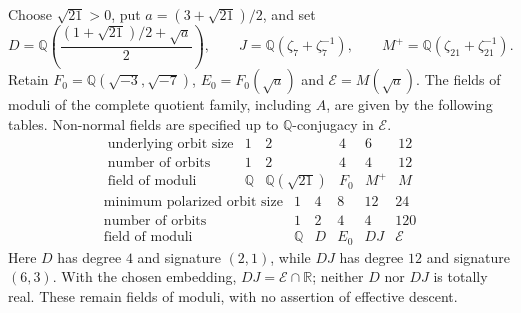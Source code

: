 \begin{theorem}
\label{pp:thm:completequotientmoduli}
Choose $\sqrt{21}>0$, put $a=(3+\sqrt{21})/2$, and set
\[
 D=\mathbb Q\left(\frac{(1+\sqrt{21})/2+\sqrt a}{2}\right),
 \qquad J=\mathbb Q(\zeta_7+\zeta_7^{-1}),
 \qquad M^+=\mathbb Q(\zeta_{21}+\zeta_{21}^{-1}).
\]
Retain $F_0=\mathbb Q(\sqrt{-3},\sqrt{-7})$,
$E_0=F_0(\sqrt a)$ and $\mathcal E=M(\sqrt a)$.
The fields of moduli of the complete quotient family, including $A$,
are given by the following tables. Non-normal fields are specified up to
$\mathbb Q$-conjugacy in $\mathcal E$.
\[
\begin{array}{c|rrrrr}
\text{underlying orbit size}&1&2&4&6&12\\\hline
\text{number of orbits}&1&2&4&4&12\\
\text{field of moduli}&\mathbb Q&\mathbb Q(\sqrt{21})&F_0&M^+&M
\end{array}
\]
\[
\begin{array}{c|rrrrr}
\text{minimum polarized orbit size}&1&4&8&12&24\\\hline
\text{number of orbits}&1&2&4&4&120\\
\text{field of moduli}&\mathbb Q&D&E_0&DJ&\mathcal E
\end{array}
\]
Here $D$ has degree $4$ and signature $(2,1)$, while $DJ$ has degree
$12$ and signature $(6,3)$. With the chosen embedding,
$DJ=\mathcal E\cap\mathbb R$; neither $D$ nor $DJ$ is totally real.
These remain fields of moduli, with no assertion of effective descent.
\end{theorem}
